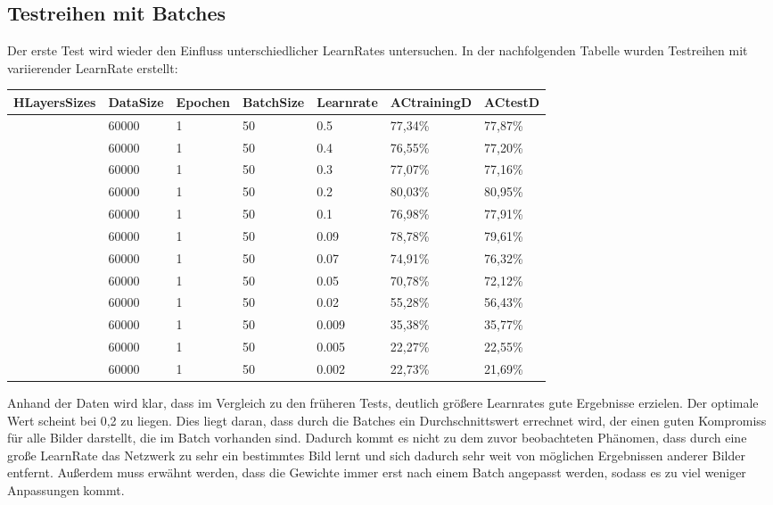 \documentclass[12pt]{article}
\begin{document}
\subsection{Testreihen mit Batches}
Der erste Test wird wieder den Einfluss unterschiedlicher LearnRates untersuchen.
In der nachfolgenden Tabelle wurden Testreihen mit variierender LearnRate erstellt: 
\begin{table}[H]
    \centering
    \begin{tabular}{|l|l|l|l|l|l|l|}
    \hline
        HLayersSizes & DataSize & Epochen & BatchSize & Learnrate & ACtrainingD & ACtestD \\ \hline
        [784, 100, 10] & 60000 & 1 & 50 & 0.5 & 77,34\% & 77,87\% \\ \hline
        [784, 100, 10] & 60000 & 1 & 50 & 0.4 & 76,55\% & 77,20\% \\ \hline
        [784, 100, 10] & 60000 & 1 & 50 & 0.3 & 77,07\% & 77,16\% \\ \hline
        [784, 100, 10] & 60000 & 1 & 50 & 0.2 & 80,03\% & 80,95\% \\ \hline
        [784, 100, 10] & 60000 & 1 & 50 & 0.1 & 76,98\% & 77,91\% \\ \hline
        [784, 100, 10] & 60000 & 1 & 50 & 0.09 & 78,78\% & 79,61\% \\ \hline
        [784, 100, 10] & 60000 & 1 & 50 & 0.07 & 74,91\% & 76,32\% \\ \hline
        [784, 100, 10] & 60000 & 1 & 50 & 0.05 & 70,78\% & 72,12\% \\ \hline
        [784, 100, 10] & 60000 & 1 & 50 & 0.02 & 55,28\% & 56,43\% \\ \hline
        [784, 100, 10] & 60000 & 1 & 50 & 0.009 & 35,38\% & 35,77\% \\ \hline
        [784, 100, 10] & 60000 & 1 & 50 & 0.005 & 22,27\% & 22,55\% \\ \hline
        [784, 100, 10] & 60000 & 1 & 50 & 0.002 & 22,73\% & 21,69\% \\ \hline
    \end{tabular}
\end{table}
Anhand der Daten wird klar, dass im Vergleich zu den früheren Tests, deutlich größere Learnrates gute Ergebnisse erzielen. Der optimale Wert scheint bei 0,2 zu liegen. Dies liegt daran, dass durch die Batches ein Durchschnittswert errechnet wird, der einen guten Kompromiss für alle Bilder darstellt, die im Batch vorhanden sind. Dadurch kommt es nicht zu dem zuvor beobachteten Phänomen, dass durch eine große LearnRate das Netzwerk zu sehr ein bestimmtes Bild lernt und sich dadurch sehr weit von möglichen Ergebnissen anderer Bilder entfernt. Außerdem muss erwähnt werden, dass die Gewichte immer erst nach einem Batch angepasst werden, sodass es zu viel weniger Anpassungen kommt. 
\end{document}
